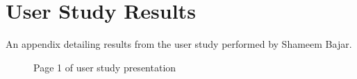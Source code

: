 \chapter{User Study Results} \label{App:User Study Results}

\begin{preamble}
	An appendix detailing results from the user study performed by Shameem Bajar.
\end{preamble}

\begin{landscape}

\begin{figure}[h]
\begin{center}
	\vspace{-10pt}
\end{center}
\caption{\label{Figure:User study presentation page 1} Page 1 of user study presentation}
\end{figure}


\end{landscape}
